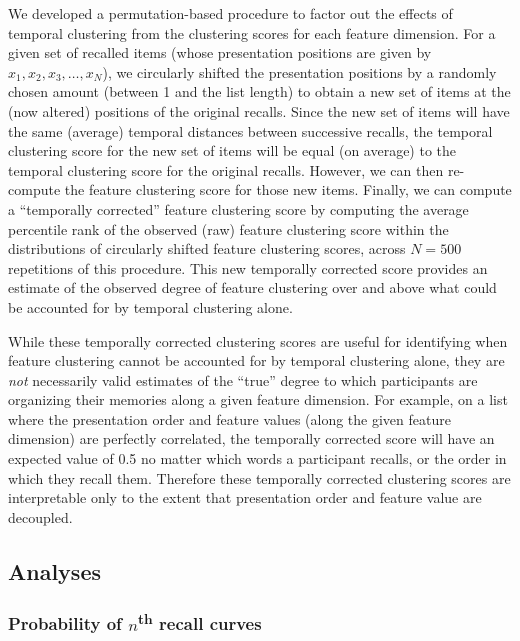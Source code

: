 \documentclass[11pt]{article}
\begin{document}
We developed a permutation-based procedure to factor out the effects of
temporal clustering from the clustering scores for each feature dimension. For
a given set of recalled items (whose presentation positions are given by $x_1,
x_2, x_3, …, x_N$), we circularly shifted the presentation positions by a
randomly chosen amount (between 1 and the list length) to obtain a new set of
items at the (now altered) positions of the original recalls. Since the new set
of items will have the same (average) temporal distances between successive
recalls, the temporal clustering score for the new set of items will be equal
(on average) to the temporal clustering score for the original recalls.
However, we can then re-compute the feature clustering score for those new
items. Finally, we can compute a ``temporally corrected'' feature clustering
score by computing the average percentile rank of the observed (raw) feature
clustering score within the distributions of circularly shifted feature
clustering scores, across $N = 500$ repetitions of this procedure. This new
temporally corrected score provides an estimate of the observed degree of
feature clustering over and above what could be accounted for by temporal
clustering alone.

While these temporally corrected clustering scores are useful for identifying
when feature clustering cannot be accounted for by temporal clustering alone,
they are \textit{not} necessarily valid estimates of the ``true'' degree to
which participants are organizing their memories along a given feature
dimension. For example, on a list where the presentation order and feature
values (along the given feature dimension) are perfectly correlated, the
temporally corrected score will have an expected value of 0.5 no matter which
words a participant recalls, or the order in which they recall them. Therefore
these temporally corrected clustering scores are interpretable only to the
extent that presentation order and feature value are decoupled.

\subsection*{Analyses}

\subsubsection*{Probability of $n$\textsuperscript{th} recall curves}
\end{document}
